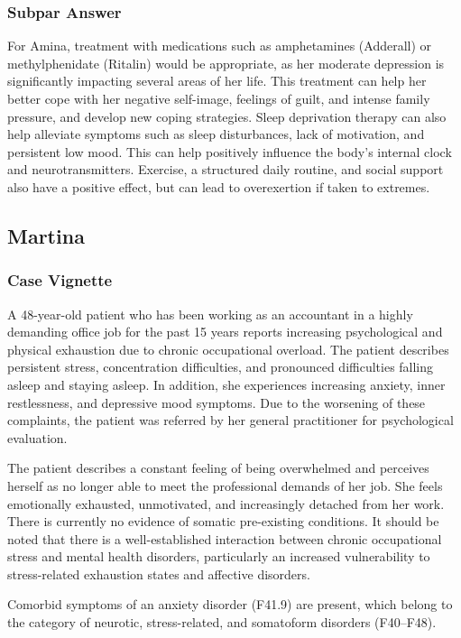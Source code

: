 \documentclass[sigconf,natbib=false]{acmart}
\begin{document}
\subsubsection{Subpar Answer}
For Amina, treatment with medications such as amphetamines (Adderall) or methylphenidate (Ritalin) would be appropriate, as her moderate depression is significantly impacting several areas of her life.
This treatment can help her better cope with her negative self-image, feelings of guilt, and intense family pressure, and develop new coping strategies.
Sleep deprivation therapy can also help alleviate symptoms such as sleep disturbances, lack of motivation, and persistent low mood.
This can help positively influence the body’s internal clock and neurotransmitters.
Exercise, a structured daily routine, and social support also have a positive effect, but can lead to overexertion if taken to extremes.

\subsection{Martina \autocite[\#tab\_fallbeispiel]{theraphysia_mentale_gesundheit}}
\label{app:MartinaFull}
\subsubsection{Case Vignette}
A 48-year-old patient who has been working as an accountant in a highly demanding office job for the past 15 years reports increasing psychological and physical exhaustion due to chronic occupational overload.
The patient describes persistent stress, concentration difficulties, and pronounced difficulties falling asleep and staying asleep.
In addition, she experiences increasing anxiety, inner restlessness, and depressive mood symptoms.
Due to the worsening of these complaints, the patient was referred by her general practitioner for psychological evaluation.

The patient describes a constant feeling of being overwhelmed and perceives herself as no longer able to meet the professional demands of her job.
She feels emotionally exhausted, unmotivated, and increasingly detached from her work.
There is currently no evidence of somatic pre-existing conditions.
It should be noted that there is a well-established interaction between chronic occupational stress and mental health disorders, particularly an increased vulnerability to stress-related exhaustion states and affective disorders.

Comorbid symptoms of an anxiety disorder (F41.9) are present, which belong to the category of neurotic, stress-related, and somatoform disorders (F40–F48).
\end{document}
